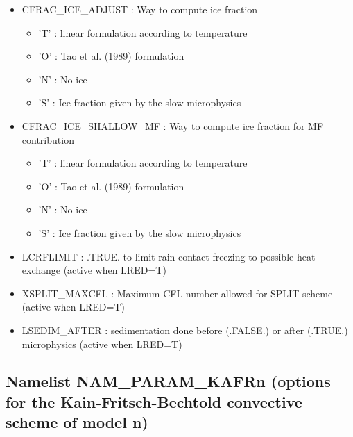 \begin{itemize}
\item 
CFRAC\_ICE\_ADJUST   : Way to compute ice fraction 
\begin{itemize}
\item{'T'} : linear formulation according to temperature
\item{'O'} : Tao et al. (1989) formulation
\item{'N'} : No ice
\item{'S'} : Ice fraction given by the slow microphysics
\end{itemize}

\item 
CFRAC\_ICE\_SHALLOW\_MF : Way to compute ice fraction for MF contribution
\begin{itemize}
\item{'T'} : linear formulation according to temperature
\item{'O'} : Tao et al. (1989) formulation
\item{'N'} : No ice
\item{'S'} : Ice fraction given by the slow microphysics
\end{itemize}

\item 
LCRFLIMIT  : .TRUE. to limit rain contact freezing to possible heat exchange (active when LRED=T)

\item 
XSPLIT\_MAXCFL : Maximum CFL number allowed for SPLIT scheme (active when LRED=T)

\item 
LSEDIM\_AFTER  : sedimentation done before (.FALSE.) or after (.TRUE.) microphysics (active when LRED=T)

\end{itemize}
\subsection{Namelist NAM\_PARAM\_KAFRn (options for the Kain-Fritsch-Bechtold convective
scheme of model n)}



